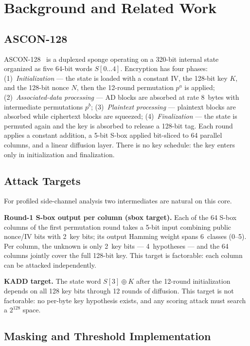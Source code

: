 \documentclass[conference]{IEEEtran}
\begin{document}
\section{Background and Related Work}
\label{sec:background}

\subsection{ASCON-128}

ASCON-128~\cite{dobraunig2021ascon} is a duplexed sponge
operating on a 320-bit internal state organized as five 64-bit
words $S[0\ldots4]$. Encryption has four phases:
(1)~\emph{Initialization} — the state is loaded with a constant
IV, the 128-bit key $K$, and the 128-bit nonce $N$, then the
12-round permutation $p^a$ is applied;
(2)~\emph{Associated-data processing} — AD blocks are absorbed
at rate 8~bytes with intermediate permutations $p^b$;
(3)~\emph{Plaintext processing} — plaintext blocks are absorbed
while ciphertext blocks are squeezed;
(4)~\emph{Finalization} — the state is permuted again and the
key is absorbed to release a 128-bit tag. Each round applies a
constant addition, a 5-bit S-box applied bit-sliced to 64
parallel columns, and a linear diffusion layer. There is no key
schedule: the key enters only in initialization and
finalization.

\subsection{Attack Targets}

For profiled side-channel analysis two intermediates are natural
on this core.

\textbf{Round-1 S-box output per column (sbox target).}
Each of the 64 S-box columns of the first permutation round
takes a 5-bit input combining public nonce/IV bits with 2~key
bits; its output Hamming weight spans 6~classes (0--5). Per
column, the unknown is only 2~key bits — 4~hypotheses — and the
64 columns jointly cover the full 128-bit key. This target is
factorable: each column can be attacked independently.

\textbf{KADD target.}
The state word $S[3] \oplus K$ after the 12-round
initialization depends on all 128 key bits through 12 rounds of
diffusion. This target is not factorable: no per-byte key
hypothesis exists, and any scoring attack must search a
$2^{128}$ space.

\subsection{Masking and Threshold Implementation}
\end{document}

